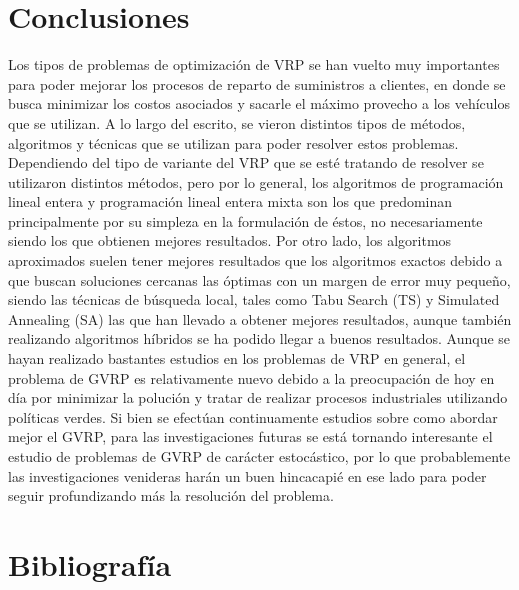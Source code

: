 \documentclass[letter, 10pt]{article}
\begin{document}
\section{Conclusiones}
Los tipos de problemas de optimización de VRP se han vuelto muy importantes para poder mejorar los procesos de reparto de suministros a clientes, en donde se busca minimizar los costos asociados y sacarle el máximo provecho a los vehículos que se utilizan. A lo largo del escrito, se vieron distintos tipos de métodos, algoritmos y técnicas que se utilizan para poder resolver estos problemas.
Dependiendo del tipo de variante del VRP que se esté tratando de resolver se utilizaron distintos métodos, pero por lo general, los algoritmos de programación lineal entera y programación lineal entera mixta son los que predominan principalmente por su simpleza en la formulación de éstos, no necesariamente siendo los que obtienen mejores resultados. Por otro lado, los algoritmos aproximados suelen tener mejores resultados que los algoritmos exactos debido a que buscan soluciones cercanas las óptimas con un margen de error muy pequeño, siendo las técnicas de búsqueda local, tales como Tabu Search (TS) y Simulated Annealing (SA) las que han llevado a obtener mejores resultados, aunque también realizando algoritmos híbridos se ha podido llegar a buenos resultados. Aunque se hayan realizado bastantes estudios en los problemas de VRP en general, el problema de GVRP es relativamente nuevo debido a la preocupación de hoy en día por minimizar la polución y tratar de realizar procesos industriales utilizando políticas verdes. Si bien se efectúan continuamente estudios sobre como abordar mejor el GVRP, para las investigaciones futuras se está tornando interesante el estudio de problemas de GVRP de carácter estocástico, por lo que probablemente las investigaciones venideras harán un buen hincacapié en ese lado para poder seguir profundizando más la resolución del problema.


\section{Bibliograf\'ia}


\end{document}
